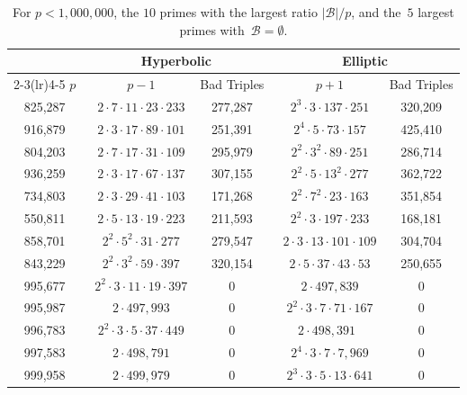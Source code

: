 \documentclass{article}
\theoremstyle{definition}
\theoremstyle{remark}
\begin{document}
\begin{table}[tph]
\begin{center}
    \caption{For $p < 1,000,000$, the $10$ primes with the largest ratio $|\mathcal{B}| / p$, and the~$5$ largest primes with~$\mathcal{B} = \emptyset$.}%
    \label{tbl:most-smalls}
    \begin{tabular}{ccccc}
        \toprule
        & \multicolumn{2}{c}{Hyperbolic} & \multicolumn{2}{c}{Elliptic} \\
        \cmidrule(lr){2-3}\cmidrule(lr){4-5}
        $p$ &~$p - 1$ & Bad Triples &~$p + 1$ & Bad Triples \\
        \midrule
        825,287	&~$2 \cdot 7 \cdot 11 \cdot 23 \cdot 233$ &	277,287 &~$2^3 \cdot 3 \cdot 137 \cdot 251$ &	320,209	    \\
        916,879	&~$2 \cdot 3 \cdot 17 \cdot 89 \cdot 101$ &	251,391	&~$2^4 \cdot 5 \cdot 73 \cdot 157$ &	425,410 \\
        804,203	&~$2 \cdot 7 \cdot 17 \cdot 31 \cdot 109$ &	295,979	&~$2^2 \cdot 3^2 \cdot 89 \cdot 251$ &	286,714	\\
        936,259	&~$2 \cdot 3 \cdot 17 \cdot 67 \cdot 137$ &	307,155	&~$2^2 \cdot 5 \cdot 13^2 \cdot 277$ &	362,722 \\
        734,803	&~$2 \cdot 3 \cdot 29 \cdot 41 \cdot 103$ &	171,268	&~$2^2 \cdot 7^2 \cdot 23 \cdot 163$ &	351,854	    \\
        550,811	&~$2 \cdot 5 \cdot 13 \cdot 19 \cdot 223$ &	211,593	&~$2^2 \cdot 3 \cdot 197 \cdot 233$ &	168,181 \\
        858,701	&~$2^2 \cdot 5^2 \cdot 31 \cdot 277$ &	279,547	&~$2 \cdot 3 \cdot 13 \cdot 101 \cdot 109$ & 304,704 \\
        843,229	&~$2^2 \cdot 3^2 \cdot 59 \cdot 397$ &	320,154	&~$2 \cdot 5 \cdot 37 \cdot 43 \cdot 53$ &	250,655	\\
        \midrule
        995,677 &~$2^2 \cdot 3 \cdot 11 \cdot 19 \cdot 397$ & 0 &~$2 \cdot 497,839$ & 0 \\
        995,987 &~$2 \cdot 497,993$ & 0 &~$2^2 \cdot 3 \cdot 7 \cdot 71 \cdot 167$ & 0 \\
        996,783 &~$2^2 \cdot 3 \cdot 5 \cdot 37 \cdot 449$ & 0 & $2 \cdot 498,391$ & 0 \\
        997,583 &~$2 \cdot 498,791$ & 0 &~$2^4 \cdot 3 \cdot 7 \cdot 7,969$ & 0 \\
        999,958 &~$2 \cdot 499,979$ & 0 &~$2^3 \cdot 3 \cdot 5 \cdot 13 \cdot 641$ & 0 \\
        \bottomrule
    \end{tabular}
\end{center}
\end{table}%
\end{document}
